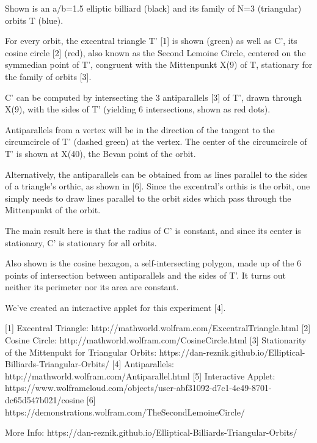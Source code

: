 Shown is an a/b=1.5 elliptic billiard (black) and its family of N=3 (triangular) orbits T (blue).

For every orbit, the excentral triangle T' [1] is shown (green) as well as C', its cosine circle [2] (red), also known as the Second Lemoine Circle, centered on the symmedian point of T', congruent with the Mittenpunkt X(9) of T, stationary for the family of orbits [3].

C' can be computed by intersecting the 3 antiparallels [3] of T', drawn through X(9), with the sides of T' (yielding 6 intersections, shown as red dots).

Antiparallels from a vertex will be in the direction of the tangent to the circumcircle of T' (dashed green) at the vertex. The center of the circumcircle of T' is shown at X(40), the Bevan point of the orbit.

Alternatively, the antiparallels can be obtained from as lines parallel to the sides of a triangle's orthic, as shown in [6]. Since the excentral's orthis is the orbit, one simply needs to draw lines parallel to the orbit sides which pass through the Mittenpunkt of the orbit.

The main result here is that the radius of C' is constant, and since its center is stationary, C' is stationary for all orbits.

Also shown is the cosine hexagon, a self-intersecting polygon, made up of the 6 points of intersection between antiparallels and the sides of T'. It turns out neither its perimeter nor its area are constant.

We've created an interactive applet for this experiment [4].

[1] Excentral Triangle: http://mathworld.wolfram.com/ExcentralTriangle.html
[2] Cosine Circle: http://mathworld.wolfram.com/CosineCircle.html
[3] Stationarity of the Mittenpukt for Triangular Orbits: https://dan-reznik.github.io/Elliptical-Billiards-Triangular-Orbits/
[4] Antiparallels:  http://mathworld.wolfram.com/Antiparallel.html
[5] Interactive Applet: https://www.wolframcloud.com/objects/user-abf31092-d7c1-4e49-8701-dc65d547b021/cosine%
[6] https://demonstrations.wolfram.com/TheSecondLemoineCircle/

More Info: https://dan-reznik.github.io/Elliptical-Billiards-Triangular-Orbits/